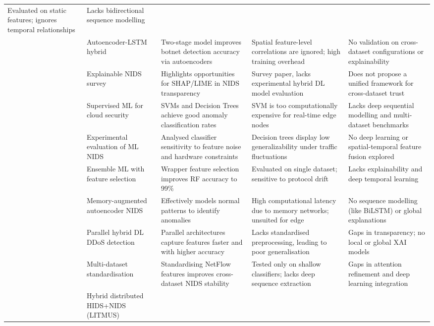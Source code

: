 \documentclass[a4paper,fleqn]{cas-sc}
\begin{document}
{\begin{landscape}
\begin{longtable}{p{4cm}p{4cm}p{4cm}p{4cm}p{4cm}}
  Evaluated on static features; ignores temporal relationships &
  Lacks bidirectional sequence modelling \\
\cite{dong2021novel} &
  Autoencoder-LSTM hybrid &
  Two-stage model improves botnet detection accuracy via autoencoders &
  Spatial feature-level correlations are ignored; high training overhead &
  No validation on cross-dataset configurations or explainability \\
\cite{liu2022explainable} &
  Explainable NIDS survey &
  Highlights opportunities for SHAP/LIME in NIDS transparency &
  Survey paper, lacks experimental hybrid DL model evaluation &
  Does not propose a unified framework for cross-dataset trust \\
\cite{bhamare2020machine} &
  Supervised ML for cloud security &
  SVMs and Decision Trees achieve good anomaly classification rates &
  SVM is too computationally expensive for real-time edge nodes &
  Lacks deep sequential modelling and multi-dataset benchmarks \\
\cite{churcher2021machine} &
  Experimental evaluation of ML NIDS &
  Analysed classifier sensitivity to feature noise and hardware constraints &
  Decision trees display low generalizability under traffic fluctuations &
  No deep learning or spatial-temporal feature fusion explored \\
\cite{soe2020machine} &
  Ensemble ML with feature selection &
  Wrapper feature selection improves RF accuracy to 99\% &
  Evaluated on single dataset; sensitive to protocol drift &
  Lacks explainability and deep temporal learning \\
\cite{abbasi2021deep} &
  Memory-augmented autoencoder NIDS &
  Effectively models normal patterns to identify anomalies &
  High computational latency due to memory networks; unsuited for edge &
  No sequence modelling (like BiLSTM) or global explanations \\
\cite{alomari2021hybrid} &
  Parallel hybrid DL DDoS detection &
  Parallel architectures capture features faster and with higher accuracy &
  Lacks standardised preprocessing, leading to poor generalisation &
  Gaps in transparency; no local or global XAI models \\
\cite{habib2023multi} &
  Multi-dataset standardisation &
  Standardising NetFlow features improves cross-dataset NIDS stability &
  Tested only on shallow classifiers; lacks deep sequence extraction &
  Gaps in attention refinement and deep learning integration \\
\cite{sanyal2026litmus} &
  Hybrid distributed HIDS+NIDS (LITMUS) &

\end{longtable}
\end{landscape}}
\end{document}
